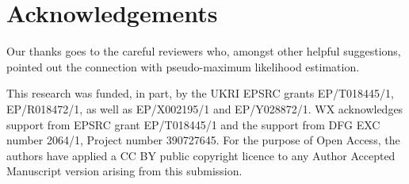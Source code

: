 \documentclass{article}
\begin{document}
\section*{Acknowledgements}
Our thanks goes to the careful reviewers who, amongst other helpful suggestions,  pointed out the connection with pseudo-maximum likelihood estimation.

This research was funded, in part, by the UKRI EPSRC grants EP/T018445/1, EP/R018472/1, as well as EP/X002195/1 and  EP/Y028872/1.  WX acknowledges support from EPSRC grant EP/T018445/1 and the support from DFG EXC number 2064/1, Project number 390727645. For the purpose of Open Access, the authors have applied a CC BY public copyright licence to any Author Accepted Manuscript version arising from this submission.



\end{document}
